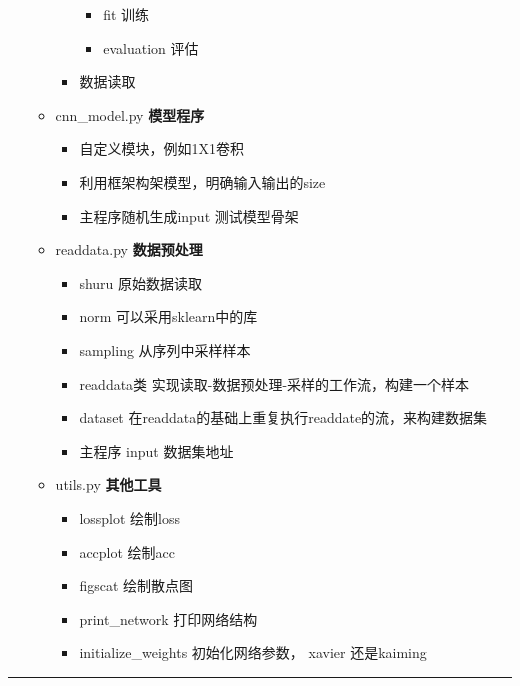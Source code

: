 \documentclass[11pt]{article}
\providecommand{\tightlist}{%
      \setlength{\itemsep}{0pt}\setlength{\parskip}{0pt}}
\begin{document}
\begin{enumerate}
\begin{itemize}
\begin{itemize}
      \begin{itemize}
      \tightlist
      \item
        fit 训练
      \item
        evaluation 评估
      \end{itemize}
    \item
      数据读取
    \end{itemize}
  \item
    cnn\_model.py \textbf{模型程序}

    \begin{itemize}
    \tightlist
    \item
      自定义模块，例如1X1卷积
    \item
      利用框架构架模型，明确输入输出的size
    \item
      主程序随机生成input 测试模型骨架
    \end{itemize}
  \item
    readdata.py \textbf{数据预处理}

    \begin{itemize}
    \tightlist
    \item
      shuru 原始数据读取
    \item
      norm 可以采用sklearn中的库
    \item
      sampling 从序列中采样样本
    \item
      readdata类 实现读取-数据预处理-采样的工作流，构建一个样本
    \item
      dataset 在readdata的基础上重复执行readdate的流，来构建数据集
    \item
      主程序 input 数据集地址
    \end{itemize}
  \item
    utils.py \textbf{其他工具}

    \begin{itemize}
    \tightlist
    \item
      lossplot 绘制loss
    \item
      accplot 绘制acc
    \item
      figscat 绘制散点图
    \item
      print\_network 打印网络结构
    \item
      initialize\_weights 初始化网络参数， xavier 还是kaiming
    \end{itemize}
  \end{itemize}
\end{enumerate}

    \begin{center}\rule{0.5\linewidth}{\linethickness}\end{center}
\end{document}
